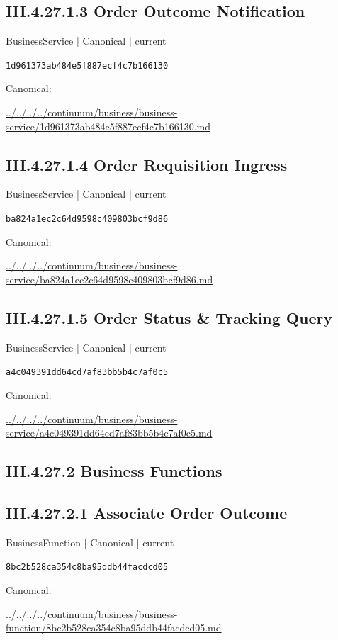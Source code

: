 \documentclass[10pt,a4paper]{article}
\begin{document}
\subsection*{III.4.27.1.3 Order Outcome Notification}
{\small BusinessService | Canonical | current}\par
\texttt{1d961373ab484e5f887ecf4c7b166130}\par
Canonical: \par
{\footnotesize\url{../../../../continuum/business/business-service/1d961373ab484e5f887ecf4c7b166130.md}}\par
\subsection*{III.4.27.1.4 Order Requisition Ingress}
{\small BusinessService | Canonical | current}\par
\texttt{ba824a1ec2c64d9598c409803bcf9d86}\par
Canonical: \par
{\footnotesize\url{../../../../continuum/business/business-service/ba824a1ec2c64d9598c409803bcf9d86.md}}\par
\subsection*{III.4.27.1.5 Order Status \& Tracking Query}
{\small BusinessService | Canonical | current}\par
\texttt{a4c049391dd64cd7af83bb5b4c7af0c5}\par
Canonical: \par
{\footnotesize\url{../../../../continuum/business/business-service/a4c049391dd64cd7af83bb5b4c7af0c5.md}}\par
\subsection*{III.4.27.2 Business Functions}
\subsection*{III.4.27.2.1 Associate Order Outcome}
{\small BusinessFunction | Canonical | current}\par
\texttt{8bc2b528ca354c8ba95ddb44facdcd05}\par
Canonical: \par
{\footnotesize\url{../../../../continuum/business/business-function/8bc2b528ca354c8ba95ddb44facdcd05.md}}\par
\end{document}
